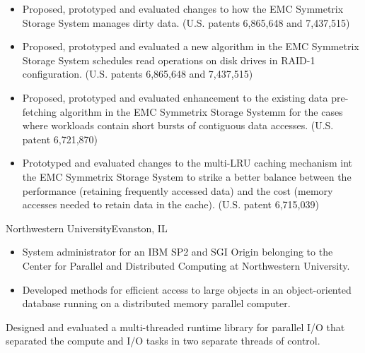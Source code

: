 {
	\begin{itemize}
		\item Proposed, prototyped and evaluated changes to how the EMC Symmetrix Storage System manages dirty data.
			(U.S. patents 6,865,648 and 7,437,515)
		\item Proposed, prototyped and evaluated a new algorithm in the EMC Symmetrix Storage System schedules read
			operations on disk drives in RAID-1 configuration. (U.S. patents 6,865,648 and 7,437,515)
		\item Proposed, prototyped and evaluated enhancement to the existing data pre-fetching algorithm
			in the EMC Symmetrix Storage Systemm for the cases where workloads contain short bursts of 
			contiguous data accesses. (U.S. patent 6,721,870)
		\item Prototyped and evaluated changes to the multi-LRU caching mechanism int the EMC Symmetrix Storage
			System to strike a better balance between the performance (retaining frequently accessed data) and the cost
			(memory accesses needed to retain data in the cache). (U.S. patent 6,715,039)
	\end{itemize}
}
{Northwestern University}{Evanston, IL}
{\begin{itemize}
	\item System administrator for an IBM SP2 and SGI Origin belonging to the 
		Center for Parallel and Distributed Computing at Northwestern University.
	\item Developed methods for efficient access to large objects in an object-oriented
		database running on a distributed memory parallel computer.
	\end{itemize}}
{Designed and evaluated a multi-threaded runtime library for parallel I/O that
separated the compute and I/O tasks in two separate threads of control.}

